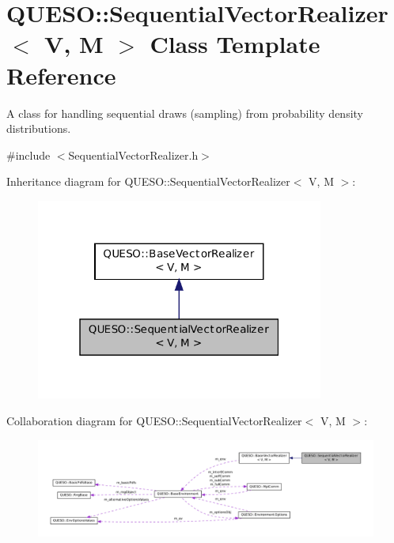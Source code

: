 \hypertarget{class_q_u_e_s_o_1_1_sequential_vector_realizer}{\section{Q\-U\-E\-S\-O\-:\-:Sequential\-Vector\-Realizer$<$ V, M $>$ Class Template Reference}
\label{class_q_u_e_s_o_1_1_sequential_vector_realizer}
}


A class for handling sequential draws (sampling) from probability density distributions.  




{\ttfamily \#include $<$Sequential\-Vector\-Realizer.\-h$>$}



Inheritance diagram for Q\-U\-E\-S\-O\-:\-:Sequential\-Vector\-Realizer$<$ V, M $>$\-:
\nopagebreak
\begin{figure}[H]
\begin{center}
\leavevmode
\includegraphics[width=268pt]{class_q_u_e_s_o_1_1_sequential_vector_realizer__inherit__graph}
\end{center}
\end{figure}


Collaboration diagram for Q\-U\-E\-S\-O\-:\-:Sequential\-Vector\-Realizer$<$ V, M $>$\-:
\nopagebreak
\begin{figure}[H]
\begin{center}
\leavevmode
\includegraphics[width=350pt]{class_q_u_e_s_o_1_1_sequential_vector_realizer__coll__graph}
\end{center}
\end{figure}
